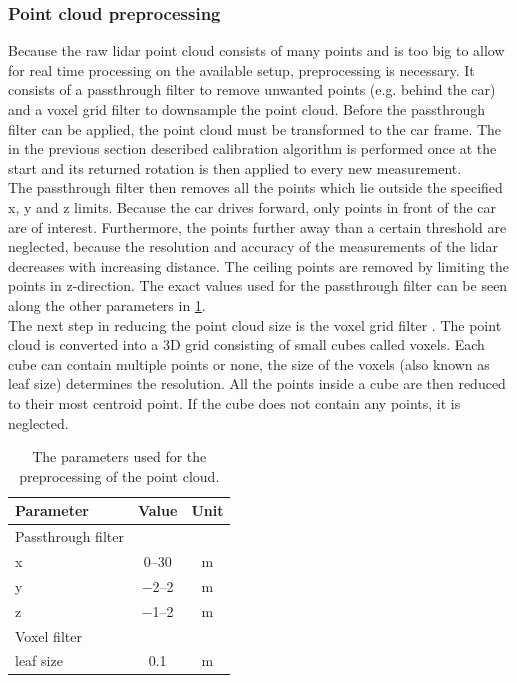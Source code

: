 \subsubsection{Point cloud preprocessing}
Because the raw \gls{lidar} point cloud consists of many points and is too big to allow for real time processing on the available setup, preprocessing is necessary.
It consists of a passthrough filter to remove unwanted points (e.g. behind the car) and a voxel grid filter to downsample the point cloud.
Before the passthrough filter can be applied, the point cloud must be transformed to the car frame.
The in the previous section described calibration algorithm is performed once at the start and its returned rotation is then applied to every new measurement.\\
The passthrough filter then removes all the points which lie outside the specified x, y and z limits.
Because the car drives forward, only points in front of the car are of interest.
Furthermore, the points further away than a certain threshold are neglected, because the resolution and accuracy of the measurements of the \gls{lidar} decreases with increasing distance.
The ceiling points are removed by limiting the points in z-direction.
The exact values used for the passthrough filter can be seen along the other parameters in \cref{tab:lidar_preprocessing_params}.\\
The next step in reducing the point cloud size is the voxel grid filter \cite{Vosselman2004}.
The point cloud is converted into a 3D grid consisting of small cubes called voxels.
Each cube can contain multiple points or none, the size of the voxels (also known as leaf size) determines the resolution.
All the points inside a cube are then reduced to their most centroid point.
If the cube does not contain any points, it is neglected.
\begin{table}[htb]
	\centering
	\caption[Parameters for the preprocessing of the point cloud]{The parameters used for the preprocessing of the point cloud.}
	\label{tab:lidar_preprocessing_params}
	\begin{tabular}[t]{lcc}
		\toprule
		\textbf{Parameter} & \textbf{Value}    & \textbf{Unit} \\
		\midrule
		Passthrough filter                                     \\
		x                  & \SIrange{0}{30}{} & \si{\metre}   \\
		y                  & \SIrange{-2}{2}{} & \si{\metre}   \\
		z                  & \SIrange{-1}{2}{} & \si{\metre}   \\
		\midrule
		Voxel filter                                           \\
		leaf size          & \SI{0.1}{}        & \si{\metre}   \\
		\bottomrule
	\end{tabular}
\end{table}

